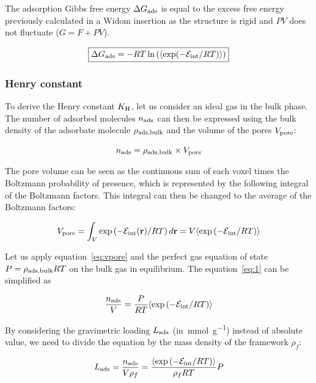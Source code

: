 \documentclass[main.tex]{subfiles}
\begin{document}
The adsorption Gibbs free energy $\Delta G_{\text{ads}}$ is equal to the excess free energy previously calculated in a Widom insertion as the structure is rigid and $PV$ does not fluctuate ($G = F + PV$). 

\begin{equation}\label{eq:ads_gibbs}
  \boxed{
  \Delta G_{\text{ads}} = -RT \ln\left(\langle \exp(-\mathcal{E}_{\text{int}}/RT) \rangle\right)
  }
\end{equation}

\subsubsection{Henry constant}

To derive the Henry constant $K_{\text{H}}$, let us consider an ideal gas in the bulk phase. The number of adsorbed molecules $n_{\text{ads}}$ can then be expressed using the bulk density of the adsorbate molecule $\rho_{\text{ads,bulk}}$ and the volume of the pores $V_{\text{pore}}$:

\begin{equation}\label{eq:1}
    n_{\text{ads}} = \rho_{\text{ads,bulk}} \times V_{\text{pore}}  
\end{equation}

The pore volume can be seen as the continuous sum of each voxel times the Boltzmann probability of presence, which is represented by the following integral of the Boltzmann factors. This integral can then be changed to the average of the Boltzmann factors:

\begin{equation}\label{eq:vpore}
    V_{\text{pore}} = \int_V \exp\left(- \mathcal{E}_{\text{int}}(\textbf{r})/RT\right) d\textbf{r} = V \langle \exp\left(-\mathcal{E}_{\text{int}}/RT\right) \rangle
\end{equation}

Let us apply equation~\ref{eq:vpore} and the perfect gas equation of state $P = \rho_{\text{ads,bulk}}RT$ on the bulk gas in equilibrium. The equation~\ref{eq:1} can be simplified as

\begin{equation}
    \dfrac{n_{\text{ads}}}{V} = \dfrac{P}{RT} \langle \exp\left(-\mathcal{E}_{\text{int}}/RT\right) \rangle
\end{equation}

By considering the gravimetric loading $L_{\text{ads}}$ (in~\si{\milli\mole\per\gram}) instead of absolute value, we need to divide the equation by the mass density of the framework $\rho_f$:

\begin{equation}
  L_{\text{ads}} = \dfrac{n_{\text{ads}}}{V\rho_f} = \dfrac{\langle \exp\left(-\mathcal{E}_{\text{int}}/RT\right) \rangle}{\rho_f RT} P
\end{equation}
\end{document}
